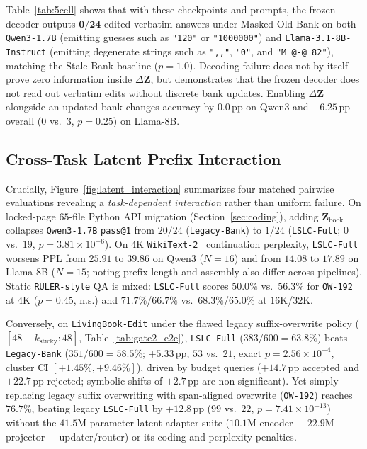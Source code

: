 \documentclass[11pt]{article}
\newcommand{\vect}[1]{\mathbf{#1}}
\newcommand{\pp}{\,\text{pp}}
\renewcommand{\_}{\origunderscore\allowbreak}
\begin{document}
Table~\ref{tab:5cell} shows that with these checkpoints and prompts, the frozen decoder outputs $\mathbf{0/24}$ edited verbatim answers under Masked-Old Bank on both \texttt{Qwen3-1.7B} (emitting guesses such as \texttt{"120"} or \texttt{"1000000"}) and \texttt{Llama-3.1-8B-Instruct} (emitting degenerate strings such as \texttt{",,"}, \texttt{"0"}, and \texttt{"M @-@ 82"}), matching the Stale Bank baseline ($p=1.0$). Decoding failure does not by itself prove zero information inside $\Delta\vect{Z}$, but demonstrates that the frozen decoder does not read out verbatim edits without discrete bank updates. Enabling $\Delta\vect{Z}$ alongside an updated bank changes accuracy by $0.0\pp$ on Qwen3 and $-6.25\pp$ overall ($0$ vs.\ $3$, $p=0.25$) on Llama-8B.

\subsection{Cross-Task Latent Prefix Interaction}
Crucially, Figure~\ref{fig:latent_interaction} summarizes four matched pairwise evaluations revealing a \emph{task-dependent interaction} rather than uniform failure. On locked-page $65$-file Python API migration (Section~\ref{sec:coding}), adding $\vect{Z}_{\text{book}}$ collapses \texttt{Qwen3-1.7B} \texttt{pass@1} from $20/24$ (\texttt{Legacy-Bank}) to $1/24$ (\texttt{LSLC-Full}; $0$ vs.\ $19$, $p=3.81\times 10^{-6}$). On $4\text{K}$ \texttt{WikiText-2}~\cite{merity2017wikitext} continuation perplexity, \texttt{LSLC-Full} worsens PPL from $25.91$ to $39.86$ on Qwen3 ($N=16$) and from $14.08$ to $17.89$ on Llama-8B ($N=15$; noting prefix length and assembly also differ across pipelines). Static \texttt{RULER-style} QA is mixed: \texttt{LSLC-Full} scores $50.0\%$ vs.\ $56.3\%$ for \texttt{OW-192} at $4\text{K}$ ($p=0.45$, n.s.) and $71.7\%$/$66.7\%$ vs.\ $68.3\%$/$65.0\%$ at $16\text{K}$/$32\text{K}$.

Conversely, on \texttt{LivingBook-Edit} under the flawed legacy suffix-overwrite policy ($[48-k_{\text{sticky}}:48]$, Table~\ref{tab:gate2_e2e}), \texttt{LSLC-Full} ($383/600 = 63.8\%$) beats \texttt{Legacy-Bank} ($351/600 = 58.5\%$; $+5.33\pp$, $53$ vs.\ $21$, exact $p=2.56\times 10^{-4}$, cluster CI $[+1.45\%, +9.46\%]$), driven by budget queries ($+14.7\pp$ accepted and $+22.7\pp$ rejected; symbolic shifts of $+2.7\pp$ are non-significant). Yet simply replacing legacy suffix overwriting with span-aligned overwrite (\texttt{OW-192}) reaches $76.7\%$, beating legacy \texttt{LSLC-Full} by $+12.8\pp$ ($99$ vs.\ $22$, $p=7.41\times 10^{-13}$) without the $41.5\text{M}$-parameter latent adapter suite ($10.1\text{M}$ encoder + $22.9\text{M}$ projector + updater/router) or its coding and perplexity penalties.
\end{document}
